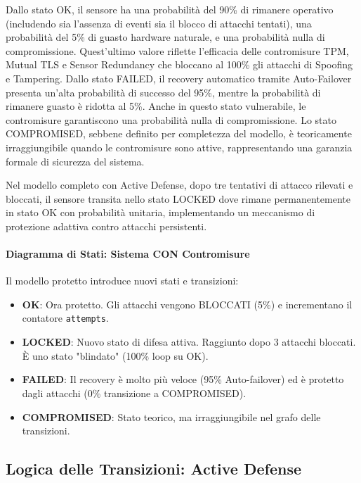 Dallo stato OK, il sensore ha una probabilità del 90\% di rimanere operativo (includendo sia l'assenza di eventi sia il blocco di attacchi tentati), una probabilità del 5\% di guasto hardware naturale, e una probabilità nulla di compromissione. Quest'ultimo valore riflette l'efficacia delle contromisure TPM, Mutual TLS e Sensor Redundancy che bloccano al 100\% gli attacchi di Spoofing e Tampering. Dallo stato FAILED, il recovery automatico tramite Auto-Failover presenta un'alta probabilità di successo del 95\%, mentre la probabilità di rimanere guasto è ridotta al 5\%. Anche in questo stato vulnerabile, le contromisure garantiscono una probabilità nulla di compromissione. Lo stato COMPROMISED, sebbene definito per completezza del modello, è teoricamente irraggiungibile quando le contromisure sono attive, rappresentando una garanzia formale di sicurezza del sistema.

Nel modello completo con Active Defense, dopo tre tentativi di attacco rilevati e bloccati, il sensore transita nello stato LOCKED dove rimane permanentemente in stato OK con probabilità unitaria, implementando un meccanismo di protezione adattiva contro attacchi persistenti.

\paragraph{Diagramma di Stati: Sistema CON Contromisure}
Il modello protetto introduce nuovi stati e transizioni:
\begin{itemize}
    \item \textbf{OK}: Ora protetto. Gli attacchi vengono BLOCCATI (5\%) e incrementano il contatore \texttt{attempts}.
    \item \textbf{LOCKED}: Nuovo stato di difesa attiva. Raggiunto dopo 3 attacchi bloccati. È uno stato "blindato" (100\% loop su OK).
    \item \textbf{FAILED}: Il recovery è molto più veloce (95\% Auto-failover) ed è protetto dagli attacchi (0\% transizione a COMPROMISED).
    \item \textbf{COMPROMISED}: Stato teorico, ma irraggiungibile nel grafo delle transizioni.
\end{itemize}

\subsection{Logica delle Transizioni: Active Defense}


